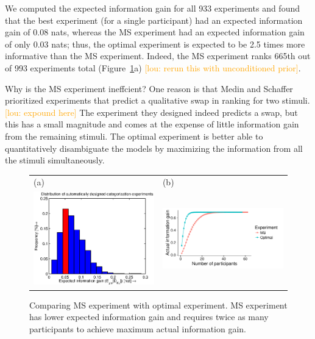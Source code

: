\documentclass{article}
\newcommand{\lou}[1]{\textcolor{orange}{[lou: #1]}}
\begin{document}
We computed the expected information gain for all 933 experiments and found that the best experiment (for a single participant) had an expected information gain of 0.08 nats, whereas the MS experiment had an expected information gain of only 0.03 nats; thus, the optimal experiment is expected to be 2.5 times more informative than the MS experiment.
Indeed, the MS experiment ranks 665th out of 993 experiments total (Figure~\ref{fig:dist}a) \lou{rerun this with unconditioned prior}.

Why is the MS experiment ineffcient?
One reason is that Medin and Schaffer prioritized experiments that predict a qualitative swap in ranking for two stimuli. \lou{expound here}
The experiment they designed indeed predicts a swap, but this has a small magnitude and comes at the expense of little information gain from the remaining stimuli.
The optimal experiment is better able to quantitatively disambiguate the models by maximizing the information from all the stimuli simultaneously.

\begin{figure}[t]
\centering
\begin{tabular}{l l}
(a) & (b)\\
\includegraphics[width=2.5in]{img/dist.eps} & \includegraphics[width=2.5in]{img/category-ns.pdf}\\
\end{tabular}
\caption{Comparing MS experiment with optimal experiment. MS experiment has lower expected information gain and requires twice as many participants to achieve maximum actual information gain.}
\label{fig:dist}
\end{figure}
\end{document}
